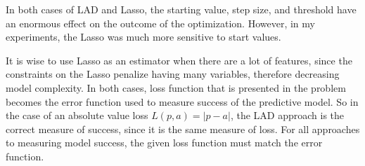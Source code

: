 \documentclass[10pt]{article}
\begin{document}
In both cases of LAD and Lasso, the starting value, step size, and threshold have an enormous effect on the outcome of the optimization. However, in my experiments, the Lasso was much more sensitive to start values.

It is wise to use Lasso as an estimator when there are a lot of features, since the constraints on the Lasso penalize having many variables, therefore decreasing model complexity. In both cases, loss function that is presented in the problem becomes the error function used to measure success of the predictive model. So in the case of an absolute value loss $L(p, a) = |p - a|$, the LAD approach is the correct measure of success, since it is the same measure of loss. For all approaches to measuring model success, the given loss function must match the error function. 
\end{document}
